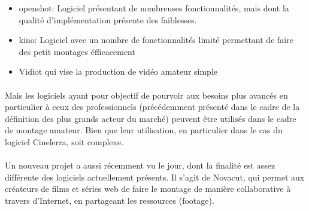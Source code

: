 \begin {itemize}

  \item {openshot: Logiciel présentant  de nombreuses fonctionnalités,
  mais dont la
    qualité d'implémentation présente des faiblesses.}

  \item {kino: Logiciel avec un nombre de fonctionnalités limité
  permettant de faire des
    petit montages éfficacement}

  \item {Vidiot qui vise la production de vidéo amateur simple}

\end {itemize}

\paragraph {}

Mais les logiciels ayant pour objectif de pourvoir aux besoins plus
avancés en particulier à ceux des professionnels (précédemment
présenté dans le cadre de la définition des plus grands acteur du
marché) peuvent être utilisés dans le cadre de montage amateur. Bien
que leur utilisation, en particulier dans le cas du logiciel Cinelerra,
soit complexe.

\paragraph{}

Un nouveau projet a aussi récemment vu le jour, dont la finalité est
assez différente des logiciels actuellement présents. Il s'agit de
Novacut, qui permet aux créateurs de films et séries web de faire le
montage de manière collaborative à travers d'Internet, en partageant
les ressources (footage).

\paragraph{}






